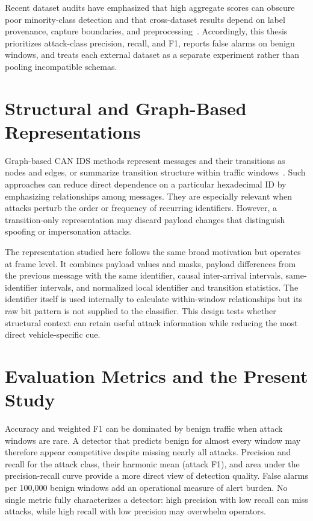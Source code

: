 \documentclass[12pt, a4paper, reqno, oneside]{book}
\begin{document}
Recent dataset audits have emphasized that high aggregate scores can obscure poor minority-class detection and that cross-dataset results depend on label provenance, capture boundaries, and preprocessing~\cite{verma2024road,kidmose2025cansleuth,koltai2026canwetrust}. Accordingly, this thesis prioritizes attack-class precision, recall, and F1, reports false alarms on benign windows, and treats each external dataset as a separate experiment rather than pooling incompatible schemas.

\section{Structural and Graph-Based Representations}
\label{sec:rw_structural}
Graph-based CAN IDS methods represent messages and their transitions as nodes and edges, or summarize transition structure within traffic windows~\cite{islam2020graph,meng2023gbids,islam2021ggnb}. Such approaches can reduce direct dependence on a particular hexadecimal ID by emphasizing relationships among messages. They are especially relevant when attacks perturb the order or frequency of recurring identifiers. However, a transition-only representation may discard payload changes that distinguish spoofing or impersonation attacks.

The representation studied here follows the same broad motivation but operates at frame level. It combines payload values and masks, payload differences from the previous message with the same identifier, causal inter-arrival intervals, same-identifier intervals, and normalized local identifier and transition statistics. The identifier itself is used internally to calculate within-window relationships but its raw bit pattern is not supplied to the classifier. This design tests whether structural context can retain useful attack information while reducing the most direct vehicle-specific cue.

\section{Evaluation Metrics and the Present Study}
\label{sec:rw_metrics}
Accuracy and weighted F1 can be dominated by benign traffic when attack windows are rare. A detector that predicts benign for almost every window may therefore appear competitive despite missing nearly all attacks. Precision and recall for the attack class, their harmonic mean (attack F1), and area under the precision-recall curve provide a more direct view of detection quality. False alarms per 100,000 benign windows add an operational measure of alert burden. No single metric fully characterizes a detector: high precision with low recall can miss attacks, while high recall with low precision may overwhelm operators.
\end{document}
